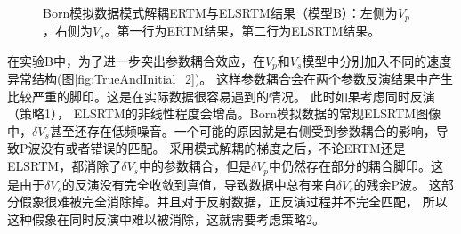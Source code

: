 \begin{figure}[!hbt]
   \centering
   \\
   \caption{Born模拟数据模式解耦ERTM与ELSRTM结果（模型B）：左侧为$V_p$，右侧为$V_s$。第一行为ERTM结果，第二行为ELSRTM结果。}
   \label{fig:decomp_2}
\end{figure}
在实验B中，为了进一步突出参数耦合效应，在$V_p$和$V_s$模型中分别加入不同的速度异常结构(图\ref{fig:TrueAndInitial_2})。
这样参数耦合会在两个参数反演结果中产生比较严重的脚印。这是在实际数据很容易遇到的情况。
此时如果考虑同时反演（策略1），
ELSRTM的非线性程度会增高。Born模拟数据的常规ELSRTM图像中，$\delta
V_s$甚至还存在低频噪音。一个可能的原因就是右侧受到参数耦合的影响，导致P波没有或者错误的匹配。
采用模式解耦的梯度之后，不论ERTM还是ELSRTM，都消除了$\delta
V_s$中的参数耦合，但是$\delta
V_p$中仍然存在部分的耦合脚印。这是由于$\delta
V_s$的反演没有完全收敛到真值，导致数据中总有来自$\delta V_s$的残余P波。
这部分假象很难被完全消除掉。并且对于反射数据，正反演过程并不完全匹配，
所以这种假象在同时反演中难以被消除，这就需要考虑策略2。

